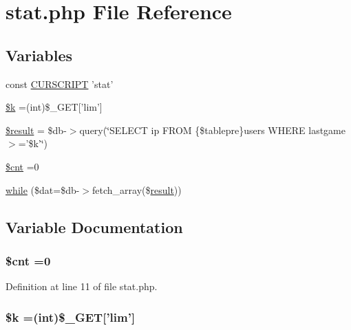 \hypertarget{stat_8php}{\section{stat.\+php File Reference}
\label{stat_8php}
}
\subsection*{Variables}
\begin{DoxyCompactItemize}
\item 
const \hyperlink{stat_8php_a39c39f525eceb86cabc338804f230e80}{C\+U\+R\+S\+C\+R\+I\+P\+T} 'stat'
\item 
\hyperlink{stat_8php_ad6726cfaa85d4b8299d2b0f034cbf178}{\$k} =(int)\$\+\_\+\+G\+E\+T\mbox{[}'lim'\mbox{]}
\item 
\hyperlink{stat_8php_a112ef069ddc0454086e3d1e6d8d55d07}{\$result} = \$db-\/$>$query(\char`\"{}S\+E\+L\+E\+C\+T ip F\+R\+O\+M \{\$tablepre\}users W\+H\+E\+R\+E lastgame$>$='\$k'\char`\"{})
\item 
\hyperlink{stat_8php_a7fd294c5884493382fc06fff757e5218}{\$cnt} =0
\item 
\hyperlink{stat_8php_ab54633a8fada54bedd1fe3c2635cfaeb}{while} (\$dat=\$db-\/$>$fetch\+\_\+array(\$\hyperlink{templates_2install_8php_abdecde238169a1e34f68354fc9968af0}{result}))
\end{DoxyCompactItemize}


\subsection{Variable Documentation}
\hypertarget{stat_8php_a7fd294c5884493382fc06fff757e5218}{
\subsubsection[{\$cnt}]{\setlength{\rightskip}{0pt plus 5cm}\$cnt =0}}\label{stat_8php_a7fd294c5884493382fc06fff757e5218}


Definition at line 11 of file stat.\+php.

\hypertarget{stat_8php_ad6726cfaa85d4b8299d2b0f034cbf178}{
\subsubsection[{\$k}]{\setlength{\rightskip}{0pt plus 5cm}\$k =(int)\$\+\_\+\+G\+E\+T\mbox{[}'lim'\mbox{]}}}\label{stat_8php_ad6726cfaa85d4b8299d2b0f034cbf178}



